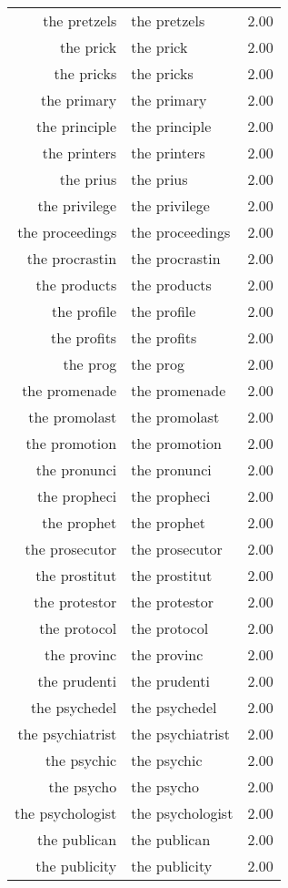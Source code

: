 \begin{table}[ht]
\begin{tabular}{rlr}
  the pretzels & the pretzels & 2.00 \\ 
  the prick & the prick & 2.00 \\ 
  the pricks & the pricks & 2.00 \\ 
  the primary & the primary & 2.00 \\ 
  the principle & the principle & 2.00 \\ 
  the printers & the printers & 2.00 \\ 
  the prius & the prius & 2.00 \\ 
  the privilege & the privilege & 2.00 \\ 
  the proceedings & the proceedings & 2.00 \\ 
  the procrastin & the procrastin & 2.00 \\ 
  the products & the products & 2.00 \\ 
  the profile & the profile & 2.00 \\ 
  the profits & the profits & 2.00 \\ 
  the prog & the prog & 2.00 \\ 
  the promenade & the promenade & 2.00 \\ 
  the promolast & the promolast & 2.00 \\ 
  the promotion & the promotion & 2.00 \\ 
  the pronunci & the pronunci & 2.00 \\ 
  the propheci & the propheci & 2.00 \\ 
  the prophet & the prophet & 2.00 \\ 
  the prosecutor & the prosecutor & 2.00 \\ 
  the prostitut & the prostitut & 2.00 \\ 
  the protestor & the protestor & 2.00 \\ 
  the protocol & the protocol & 2.00 \\ 
  the provinc & the provinc & 2.00 \\ 
  the prudenti & the prudenti & 2.00 \\ 
  the psychedel & the psychedel & 2.00 \\ 
  the psychiatrist & the psychiatrist & 2.00 \\ 
  the psychic & the psychic & 2.00 \\ 
  the psycho & the psycho & 2.00 \\ 
  the psychologist & the psychologist & 2.00 \\ 
  the publican & the publican & 2.00 \\ 
  the publicity & the publicity & 2.00 \\ 

\end{tabular}
\end{table}
